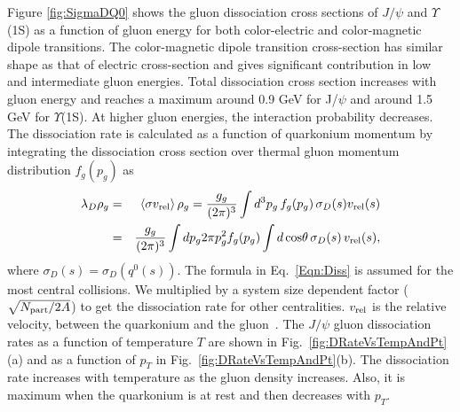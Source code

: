 \documentclass[12pt,a4paper,final]{iopart} %
\newcommand{\Jpsi}{J/\psi}
\begin{document}
Figure \ref{fig:SigmaDQ0} shows the gluon dissociation cross sections
of $\Jpsi$ and $\Upsilon$(1S) as a function of gluon energy
for both color-electric and color-magnetic dipole transitions.
The color-magnetic dipole transition cross-section has similar shape as that of
electric cross-section and gives significant contribution 
in low and intermediate gluon energies. Total dissociation cross section increases
with gluon energy and reaches a maximum around 0.9 GeV for
J/$\psi$ and around 1.5 GeV for $\Upsilon$(1S). At higher gluon energies, the
interaction probability decreases. 
The dissociation rate is calculated as a function of quarkonium momentum 
by integrating the dissociation cross section over thermal gluon momentum 
distribution $f_{g}(p_g)$ as 
\begin{eqnarray}
\lambda_{D} \rho_{g}  & = & \langle \sigma v_{\rm rel} \rangle \,\rho_{g}  = \frac{g_g}{(2\pi)^{3}} \int d^{3}p_g \, f_{g}(p_g)  \, \sigma_{D}(s) v_{\rm rel}(s)  \nonumber \\ 
                   & = & \frac{g_g}{(2\pi)^{3}} \int dp_g 2\pi p_g^{2} f_{g}(p_g) \int d\,{\rm cos\theta}\,\sigma_{D}(s)\,v_{\rm rel}(s),
\label{Eqn:Diss}
\end{eqnarray}
where $\sigma_{D}(s) = \sigma_{D}(q^0(s))$. The formula in Eq.~\ref{Eqn:Diss} is assumed
for the most central collisions. We multiplied by a system size dependent factor
($\sqrt{N_{\rm part}/2A}$) to get the dissociation rate for other centralities.   
$v_{\rm rel}$ is the relative velocity, between the quarkonium and the gluon~\cite{Kumar:2014kfa}.
 The $\Jpsi$ gluon dissociation rates as a function of temperature $T$ are shown in 
Fig.~\ref{fig:DRateVsTempAndPt}(a) and as a function of $p_T$ in Fig.~\ref{fig:DRateVsTempAndPt}(b).
The dissociation rate increases with temperature as the gluon density increases. 
Also, it is maximum when the quarkonium is at rest and then decreases with $p_T$.
\end{document}
